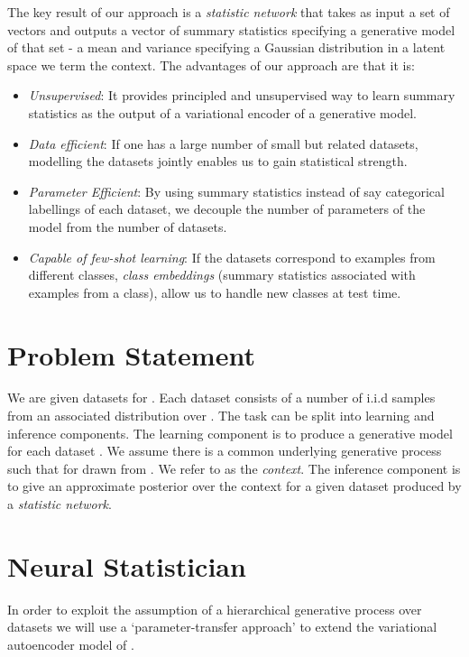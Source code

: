 \documentclass{article} \usepackage{iclr2017_conference,times}
\newcommand{\iid}{i.i.d }
\begin{document}
The key result of our approach is a \emph{statistic network} that takes as input a set of vectors and outputs a vector of summary statistics specifying a generative model of that set - a mean and variance specifying a Gaussian distribution in a latent space we term the context. The advantages of our approach are that it is:
\begin{itemize}
\item \emph{Unsupervised}: It provides principled and unsupervised way to learn summary statistics as the output of a variational encoder of a generative model.
\item \emph{Data efficient}: If one has a large number of small but related datasets, modelling the datasets jointly enables us to gain statistical strength.
\item \emph{Parameter Efficient}: By using summary statistics instead of say categorical labellings of each dataset, we decouple the number of parameters of the model from the number of datasets.
\item \emph{Capable of few-shot learning}: If the datasets correspond to examples from different classes, \emph{class embeddings} (summary statistics associated with examples from a class), allow us to handle new classes at test time.
\end{itemize}


\section{Problem Statement}
\vspace{-0.5em}
We are given datasets  for . Each dataset  consists of a number of \iid samples from an associated distribution  over . The task can be split into learning and inference components. The learning component is to produce a generative model  for each dataset . We assume there is a common underlying generative process  such that  for  drawn from . We refer to  as the \emph{context}. The inference component is to give an approximate posterior over the context  for a given dataset produced by a \emph{statistic network}.

\vspace{-0.5em}
\section{Neural Statistician}

In order to exploit the assumption of a hierarchical generative process over datasets we will use a `parameter-transfer approach'
\citep[see][]{transfer_survey} to extend the variational autoencoder model of  \citet{variational_autoencoder}. 
\end{document}

